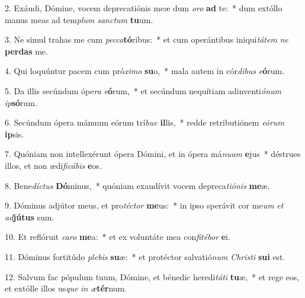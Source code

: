 2. Exáudi, Dómine, vocem deprecatiónis meæ dum \textit{o}\textit{ro} \textbf{ad} te:~*  dum extóllo manus meas ad tem\textit{plum} \textit{sanc}\textit{tum} \textbf{tu}um.\

3. Ne simul trahas me cum \textit{pec}\textit{ca}\textbf{tó}ribus:~*  et cum operántibus iniqui\textit{tá}\textit{tem} \textit{ne} \textbf{per}\textbf{das} me.\

4. Qui loquúntur pacem cum pró\textit{xi}\textit{mo} \textbf{su}o,~*  mala autem in cór\textit{di}\textit{bus} \textit{e}\textbf{ó}rum.\

5. Da illis secúndum ópe\textit{ra} \textit{e}\textbf{ó}rum,~*  et secúndum nequítiam adinventi\textit{ó}\textit{num} \textit{ip}\textbf{só}rum.\

6. Secúndum ópera mánuum eórum trí\textit{bu}\textit{e} \textbf{il}lis,~*  redde retributiónem \textit{e}\textit{ó}\textit{rum} \textbf{ip}sis.\

7. Quóniam non intellexérunt ópera Dómini, et in ópera má\textit{nu}\textit{um} \textbf{e}jus~*  déstrues illos, et non ædi\textit{fi}\textit{cá}\textit{bis} \textbf{e}os.\

8. Bene\textit{díc}\textit{tus} \textbf{Dó}minus,~*  quóniam exaudívit vocem depreca\textit{ti}\textit{ó}\textit{nis} \textbf{me}æ.\

9. Dóminus adjútor meus, et pro\textit{téc}\textit{tor} \textbf{me}us:~*  in ipso sperávit cor me\textit{um} \textit{et} \textit{ad}\textbf{jú}\textbf{tus} sum.\

10. Et reflóruit \textit{ca}\textit{ro} \textbf{me}a:~*  et ex voluntáte mea con\textit{fi}\textit{té}\textit{bor} \textbf{e}i.\

11. Dóminus fortitúdo \textit{ple}\textit{bis} \textbf{su}æ:~*  et protéctor salvatió\textit{num} \textit{Chris}\textit{ti} \textbf{su}\textbf{i} est.\

12. Salvum fac pópulum tuum, Dómine, et bénedic heredi\textit{tá}\textit{ti} \textbf{tu}æ,~*  et rege eos, et extólle illos us\textit{que} \textit{in} \textit{æ}\textbf{tér}num.\


